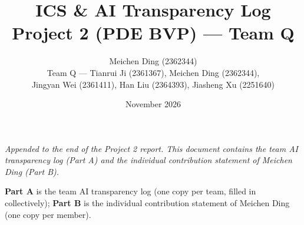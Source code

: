 \documentclass[11pt]{article}
\title{\textbf{ICS \& AI Transparency Log}\\[2mm]
\large Project 2 (PDE BVP) --- Team Q}
\author{Meichen Ding (2362344)\\
Team Q --- Tianrui Ji (2361367), Meichen Ding (2362344),\\
Jingyan Wei (2361411), Han Liu (2364393), Jiasheng Xu (2251640)}
\date{November 2026}
\begin{document}
\maketitle

\noindent\emph{Appended to the end of the Project 2 report. This document
contains the team AI transparency log (Part A) and the individual contribution
statement of Meichen Ding (Part B).}

\textbf{Part A} is the team AI transparency log (one copy per team, filled in
collectively); \textbf{Part B} is the individual contribution statement of
Meichen Ding (one copy per member).


\end{document}

